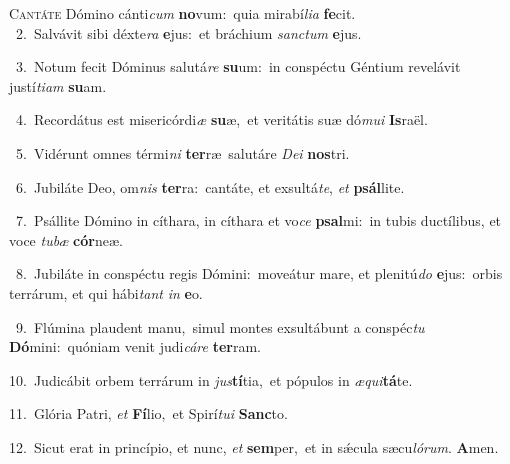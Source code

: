 \lettrine{\initial\textcolor{\initialcolor}{C}}{antáte} Dómino cánti\textit{cum} \textbf{no}\-vum:~\star quia mirabí\-\textit{li}\-\textit{a} \textbf{fe}\-cit.\\
{\numbfont\textcolor{\numbcolor}{~2.}}~Salvávit sibi déxte\textit{ra} \textbf{e}\-jus:~\star et bráchium \textit{sanc}\-\textit{tum} \textbf{e}\-jus.\par
{\numbfont\textcolor{\numbcolor}{~3.}}~Notum fecit Dóminus salutá\textit{re} \textbf{su}\-um:~\star in conspéctu Géntium revelávit justí\-\textit{ti}\-\textit{am} \textbf{su}\-am.\par
{\numbfont\textcolor{\numbcolor}{~4.}}~Recordátus est misericórdi\textit{æ} \textbf{su}\-æ,~\star et veritátis suæ dó\-\textit{mu}\-\textit{i} \textbf{Is}\-raël.\par
{\numbfont\textcolor{\numbcolor}{~5.}}~Vidérunt omnes térmi\textit{ni} \textbf{ter}\-ræ~\star salutáre \textit{De}\-\textit{i} \textbf{nos}\-tri.\par
{\numbfont\textcolor{\numbcolor}{~6.}}~Jubiláte Deo, om\textit{nis} \textbf{ter}\-ra:~\star cantáte, et exsultá\-\textit{te}\-, \textit{et} \textbf{psál}\-lite.\par
{\numbfont\textcolor{\numbcolor}{~7.}}~Psállite Dómino in cíthara, in cíthara et vo\textit{ce} \textbf{psal}\-mi:~\star in tubis ductílibus, et voce \textit{tu}\-\textit{bæ} \textbf{cór}\-neæ.\par
{\numbfont\textcolor{\numbcolor}{~8.}}~Jubiláte in conspéctu regis Dómini:~\dagger moveátur mare, et plenitú\textit{do} \textbf{e}\-jus:~\star orbis terrárum, et qui hábi\textit{tant} \textit{in} \textbf{e}\-o.\par
{\numbfont\textcolor{\numbcolor}{~9.}}~Flúmina plaudent manu,~\dagger simul montes exsultábunt a conspéc\textit{tu} \textbf{Dó}\-mini:~\star quóniam venit judi\-\textit{cá}\-\textit{re} \textbf{ter}\-ram.\par
{\numbfont\textcolor{\numbcolor}{10.}}~Judicábit orbem terrárum in \textit{jus}\-\textbf{tí}tia,~\star et pópulos in \textit{æ}\-\textit{qui}\textbf{tá}te.\par
{\numbfont\textcolor{\numbcolor}{11.}}~Glória Patri, \textit{et} \textbf{Fí}\-lio,~\star et Spirí\-\textit{tu}\-\textit{i} \textbf{Sanc}\-to.\par
{\numbfont\textcolor{\numbcolor}{12.}}~Sicut erat in princípio, et nunc, \textit{et} \textbf{sem}\-per,~\star et in sǽcula sæcu\-\textit{ló}\-\textit{rum}. \textbf{A}\-men.\par
